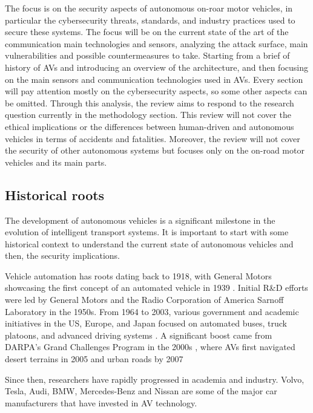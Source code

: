 The focus is on the security aspects of autonomous on-roar motor vehicles,
in particular the cybersecurity threats, standards, and industry practices used to secure these systems.
The focus will be on the current state of the art of the communication main technologies and sensors,
analyzing the attack surface, main vulnerabilities and possible countermeasures to take.
Starting from a brief of history of AVs and introducing an overview of the architecture, and then focusing on the main sensors and communication technologies used in AVs.
Every section will pay attention mostly on the cybersecurity aspects, so some other aspects can be omitted.
Through this analysis, the review aims to respond to the research question currently in the methodology section.
This review will not cover the ethical implications or the differences between human-driven and autonomous vehicles in terms of accidents and fatalities.
Moreover, the review will not cover the security of other autonomous systems
but focuses only on the on-road motor vehicles and its main parts.

\subsection{Historical roots}\label{subsec:historical-roots}

The development of autonomous vehicles is a significant milestone in the evolution of intelligent transport systems.
It is important to start with some historical context to understand the current state of autonomous vehicles and then,
the security implications.

Vehicle automation has roots dating back to 1918\cite{pendleton2017perception},
with General Motors showcasing the first concept of an automated vehicle in 1939 \cite{shladover2017connected} .
Initial R\&D efforts were led by General Motors and the Radio Corporation of America Sarnoff Laboratory in the 1950s.
From 1964 to 2003, various government and academic initiatives in the US, Europe,
and Japan focused on automated buses, truck platoons, and advanced driving systems
\cite{shladover2017connected} .
A significant boost came from DARPA’s Grand Challenges Program in the 2000s \cite{darpa_grand_challenges_book},
where AVs first navigated desert terrains in 2005 and urban roads by 2007 \cite{pendleton2017perception, shladover2017connected}

Since then, researchers have rapidly progressed in academia and industry.
Volvo, Tesla, Audi, BMW,
Mercedes-Benz and Nissan are some of the major car manufacturers that have invested in AV technology\cite{faisal2019understanding}.


